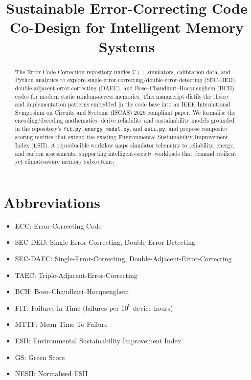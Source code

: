 \documentclass[conference]{IEEEtran}
\begin{document}
\title{Sustainable Error-Correcting Code Co-Design for Intelligent Memory Systems}
\author{}
\maketitle
\begin{abstract}
The Error-Code-Correction repository unifies C++ simulators, calibration data, and Python analytics to explore single-error-correcting/double-error-detecting (SEC-DED), double-adjacent-error-correcting (DAEC), and Bose--Chaudhuri--Hocquenghem (BCH) codes for modern static random-access memories.
This manuscript distils the theory and implementation patterns embedded in the code base into an IEEE International Symposium on Circuits and Systems (ISCAS) 2026 compliant paper.
We formalise the encoding/decoding mathematics, derive reliability and sustainability models grounded in the repository's \texttt{fit.py}, \texttt{energy\_model.py}, and \texttt{esii.py}, and propose composite scoring metrics that extend the existing Environmental Sustainability Improvement Index (ESII).
A reproducible workflow maps simulator telemetry to reliability, energy, and carbon assessments, supporting intelligent-society workloads that demand resilient yet climate-aware memory subsystems.
\end{abstract}
\section*{Abbreviations}
\begin{itemize}
    \item ECC: Error-Correcting Code
    \item SEC-DED: Single-Error-Correcting, Double-Error-Detecting
    \item SEC-DAEC: Single-Error-Correcting, Double-Adjacent-Error-Correcting
    \item TAEC: Triple-Adjacent-Error-Correcting
    \item BCH: Bose--Chaudhuri--Hocquenghem
    \item FIT: Failures in Time (failures per $10^{9}$ device-hours)
    \item MTTF: Mean Time To Failure
    \item ESII: Environmental Sustainability Improvement Index
    \item GS: Green Score
    \item NESII: Normalised ESII
\end{itemize}
\end{document}
